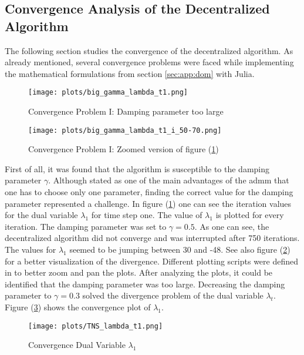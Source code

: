 \subsection{Convergence Analysis of the Decentralized Algorithm}
\label{sec:res:conv}

The following section studies the convergence of the decentralized algorithm. As already mentioned, several convergence problems were faced while implementing the mathematical formulations from section \ref{sec:app:dom} with Julia. \\

\begin{figure}[h!]
	\centering
	\texttt{[image: plots/big\_gamma\_lambda\_t1.png]}
	\caption{Convergence Problem I: Damping parameter too large}
	\label{fig:conv-problem-1}
\end{figure}

\begin{figure}[h!]
	\centering
	\texttt{[image: plots/big\_gamma\_lambda\_t1\_i\_50-70.png]}
	\caption{Convergence Problem I: Zoomed version of figure (\ref{fig:conv-problem-1})}
	\label{fig:conv-problem-1-zoom}
\end{figure}

First of all, it was found that the algorithm is susceptible to the damping parameter $\gamma$. Although stated as one of the main advantages of the \gls{admm} that one has to choose only one parameter, finding the correct value for the damping parameter represented a challenge. In figure (\ref{fig:conv-problem-1}) one can see the iteration values for the dual variable $\lambda_1$ for time step one. The value of $\lambda_1$ is plotted for every iteration. The damping parameter was set to $\gamma = 0.5$. As one can see, the decentralized algorithm did not converge and was interrupted after 750 iterations. The values for $\lambda_1$ seemed to be jumping between 30 and -48. See also figure (\ref{fig:conv-problem-1-zoom}) for a better visualization of the divergence. Different plotting scripts were defined in  to better zoom and pan the plots. After analyzing the plots, it could be identified that the damping parameter was too large. Decreasing the damping parameter to $\gamma = 0.3$ solved the divergence problem of the dual variable $\lambda_t$. Figure (\ref{fig:conv-lambda}) shows the convergence plot of $\lambda_1$. \\

\begin{figure}[h!]
	\centering
	\texttt{[image: plots/TNS\_lambda\_t1.png]}
	\caption{Convergence Dual Variable $\lambda_1$}
	\label{fig:conv-lambda}
\end{figure}

